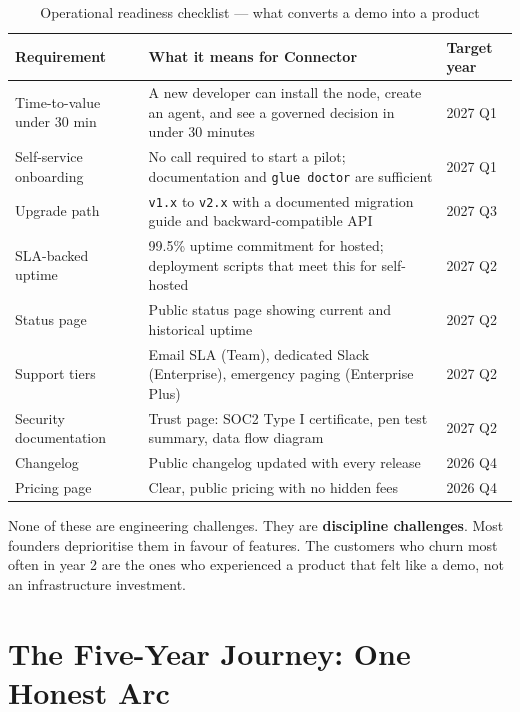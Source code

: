 \begin{table}[H]
\centering
\renewcommand{\arraystretch}{1.45}
\begin{tabularx}{\textwidth}{@{}lXl@{}}
\toprule
\textbf{Requirement} & \textbf{What it means for Connector} & \textbf{Target year} \\
\midrule
Time-to-value under 30 min & A new developer can install the node, create an agent, and see a governed decision in under 30 minutes & 2027 Q1 \\
Self-service onboarding & No call required to start a pilot; documentation and \texttt{glue doctor} are sufficient & 2027 Q1 \\
Upgrade path & \texttt{v1.x} to \texttt{v2.x} with a documented migration guide and backward-compatible API & 2027 Q3 \\
SLA-backed uptime & 99.5\% uptime commitment for hosted; deployment scripts that meet this for self-hosted & 2027 Q2 \\
Status page & Public status page showing current and historical uptime & 2027 Q2 \\
Support tiers & Email SLA (Team), dedicated Slack (Enterprise), emergency paging (Enterprise Plus) & 2027 Q2 \\
Security documentation & Trust page: SOC2 Type I certificate, pen test summary, data flow diagram & 2027 Q2 \\
Changelog & Public changelog updated with every release & 2026 Q4 \\
Pricing page & Clear, public pricing with no hidden fees & 2026 Q4 \\
\bottomrule
\end{tabularx}
\caption{Operational readiness checklist — what converts a demo into a product}
\end{table}

None of these are engineering challenges. They are \textbf{discipline challenges}.
Most founders deprioritise them in favour of features. The customers who churn
most often in year 2 are the ones who experienced a product that felt like a
demo, not an infrastructure investment.

\section{The Five-Year Journey: One Honest Arc}

